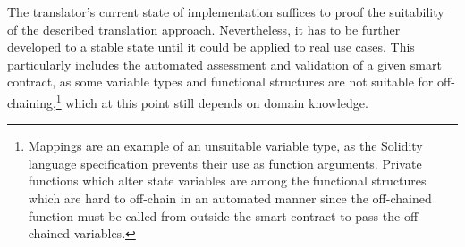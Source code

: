 	The translator's current state of implementation suffices to proof the suitability of the described translation approach. Nevertheless, it has to be further developed to a stable state until it could be applied to real use cases. This particularly includes the automated assessment and validation of a given smart contract, as some variable types and functional structures are not suitable for off-chaining,\footnote{Mappings are an example of an unsuitable variable type, as the Solidity language specification prevents their use as function arguments. Private functions which alter state variables are among the functional structures which are hard to off-chain in an automated manner since the off-chained function must be called from outside the smart contract to pass the off-chained variables.} which at this point still depends on domain knowledge.
